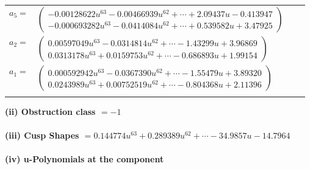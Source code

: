\documentclass[1p]{elsarticle_modified}
\theoremstyle{definition}
\begin{document}
\begin{tabular}{m{7pt} m{180pt} m{7pt} m{180pt} }
\flushright $a_{5}=$&$\begin{pmatrix}-0.00128622 u^{63}-0.00466939 u^{62}+\cdots+2.09437 u-0.413947\\-0.000693282 u^{63}-0.0414084 u^{62}+\cdots+0.539582 u+3.47925\end{pmatrix}$ \\
\flushright $a_{2}=$&$\begin{pmatrix}0.00597049 u^{63}-0.0314814 u^{62}+\cdots-1.43299 u+3.96869\\0.0313178 u^{63}+0.0159753 u^{62}+\cdots-0.686893 u+1.99154\end{pmatrix}$ \\
\flushright $a_{1}=$&$\begin{pmatrix}0.000592942 u^{63}-0.0367390 u^{62}+\cdots-1.55479 u+3.89320\\0.0243989 u^{63}+0.00752519 u^{62}+\cdots-0.804368 u+2.11396\end{pmatrix}$\\&\end{tabular}
\flushleft \textbf{(ii) Obstruction class $= -1$}\\~\\
\flushleft \textbf{(iii) Cusp Shapes $= 0.144774 u^{63}+0.289389 u^{62}+\cdots-34.9857 u-14.7964$}\\~\\
\newpage\renewcommand{\arraystretch}{1}
\flushleft \textbf{(iv) u-Polynomials at the component}\newline \\
\end{document}

